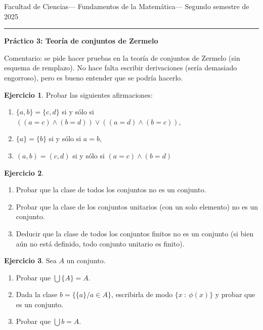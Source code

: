 \documentclass[a4paper,12pt]{book}
\theoremstyle{definition}
\newtheorem{ejercicio}{Ejercicio}
\begin{document}
	
	\noindent
	\centerline{\sc
		Facultad de Ciencias\hfill---\hfill
		Fundamentos de la Matemática\hfill---\hfill
		Segundo semestre de 2025}\smallbreak\hrule
	
	\bigbreak
	\centerline{\Large\textbf{Práctico 3: Teoría de conjuntos de Zermelo}}
	\bigbreak
	
	Comentario: se pide hacer pruebas en la teoría de conjuntos de Zermelo (sin esquema de remplazo). No hace falta escribir derivaciones (sería demasiado engorroso), pero es bueno entender que se podría hacerlo.
	
	\begin{ejercicio}
		Probar las siguientes afirmaciones:
		\begin{enumerate}\parskip -.5ex
			\item $\{a,b\}=\{c,d\}$ si y s\'olo si $\left ((a=c) \wedge (b=d)\right )\vee \left ((a=d) \wedge (b=c)\right )$,
			\item $\{a\}=\{b\}$ si y s\'olo si $a=b$,
			\item $(a,b)=(c,d)$ si y s\'olo si $(a=c) \wedge (b=d)$
		\end{enumerate}
	\end{ejercicio}
	
	\begin{ejercicio}
		\begin{enumerate}\parskip -.5ex
			\item Probar que la clase de todos los conjuntos no es un conjunto.
			\item Probar que la clase de los conjuntos unitarios (con un solo elemento) no es un conjunto.
			\item Deducir que la clase de todos los conjuntos finitos no es un conjunto (si bien aún no está definido, todo conjunto unitario es finito).
		\end{enumerate}
	\end{ejercicio}
	
	\begin{ejercicio}
		Sea $A$ un conjunto.
		\begin{enumerate}\parskip -.5ex
			\item Probar que $\bigcup\{A\} = A$.
			\item Dada la clase $b=\{\{a\}/a \in A\}$,  escribirla de modo $\{x~:~\phi(x)\}$ y probar que es un conjunto.
			\item Probar que $\bigcup b=A$.
		\end{enumerate}
	\end{ejercicio}
	
\end{document}
